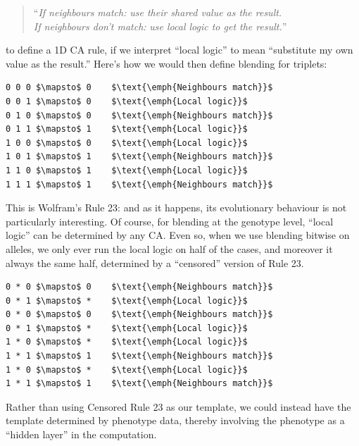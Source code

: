 \documentclass{AISB2008}
\begin{document}
\begin{quote}
``\emph{If neighbours match:} \emph{use their shared value as the result.}\\
 \emph{If neighbours don't match:} \emph{use local logic to get the result.}''
\end{quote}

\noindent to define a 1D CA rule, if we interpret ``local logic'' to
mean ``substitute my own value as the result.''  Here's how we would
then define blending for triplets:

\lstset{
  xleftmargin=.2\columnwidth, xrightmargin=.01\columnwidth
}

\begin{lstlisting}[mathescape]
0 0 0 $\mapsto$ 0    $\text{\emph{Neighbours match}}$
0 0 1 $\mapsto$ 0    $\text{\emph{Local logic}}$
0 1 0 $\mapsto$ 0    $\text{\emph{Neighbours match}}$
0 1 1 $\mapsto$ 1    $\text{\emph{Local logic}}$
1 0 0 $\mapsto$ 0    $\text{\emph{Local logic}}$
1 0 1 $\mapsto$ 1    $\text{\emph{Neighbours match}}$
1 1 0 $\mapsto$ 1    $\text{\emph{Local logic}}$
1 1 1 $\mapsto$ 1    $\text{\emph{Neighbours match}}$
\end{lstlisting}

This is Wolfram's Rule 23: and as it happens, its evolutionary
behaviour is not particularly interesting.  Of course, for blending at
the genotype level, ``local logic'' can be determined by any CA.  Even
so, when we use blending bitwise on alleles, we only ever run the
local logic on half of the cases, and moreover it always the same
half, determined by a ``censored'' version of Rule 23.

\begin{lstlisting}[mathescape]
0 * 0 $\mapsto$ 0    $\text{\emph{Neighbours match}}$
0 * 1 $\mapsto$ *    $\text{\emph{Local logic}}$
0 * 0 $\mapsto$ 0    $\text{\emph{Neighbours match}}$
0 * 1 $\mapsto$ *    $\text{\emph{Local logic}}$
1 * 0 $\mapsto$ *    $\text{\emph{Local logic}}$
1 * 1 $\mapsto$ 1    $\text{\emph{Neighbours match}}$
1 * 0 $\mapsto$ *    $\text{\emph{Local logic}}$
1 * 1 $\mapsto$ 1    $\text{\emph{Neighbours match}}$
\end{lstlisting}

Rather than using Censored Rule 23 as our template, we could instead
have the template determined by phenotype data, thereby involving the
phenotype as a ``hidden layer'' in the computation.
\end{document}
